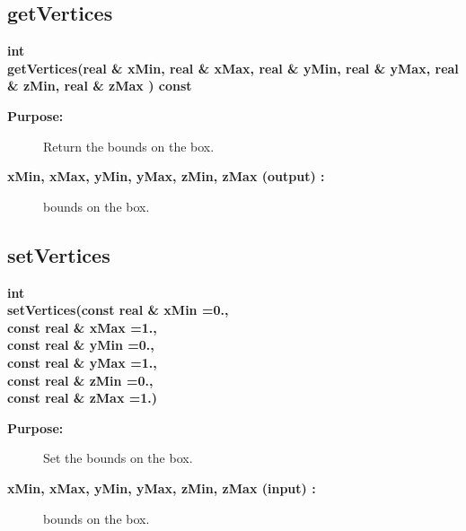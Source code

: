 \subsection{getVertices}
 
\begin{flushleft} \textbf{%
int   \\ 
\settowidth{\BoxMappingIncludeArgIndent}{getVertices(}%
getVertices(real \& xMin, real \& xMax, real \& yMin, real \& yMax, real \& zMin, real \& zMax ) const
}\end{flushleft}
\begin{description}
\item[{\bf Purpose:}]  Return the bounds on the box.
\item[{\bf xMin, xMax, yMin, yMax, zMin, zMax (output) :}]  bounds on the box.
\end{description}
\subsection{setVertices}
 
\begin{flushleft} \textbf{%
int  \\ 
\settowidth{\BoxMappingIncludeArgIndent}{setVertices(}%
setVertices(const real \& xMin  =0.,\\ 
\hspace{\BoxMappingIncludeArgIndent}const real \& xMax  =1., \\ 
\hspace{\BoxMappingIncludeArgIndent}const real \& yMin  =0., \\ 
\hspace{\BoxMappingIncludeArgIndent}const real \& yMax  =1.,\\ 
\hspace{\BoxMappingIncludeArgIndent}const real \& zMin  =0.,\\ 
\hspace{\BoxMappingIncludeArgIndent}const real \& zMax  =1.)
}\end{flushleft}
\begin{description}
\item[{\bf Purpose:}]  Set the bounds on the box.
\item[{\bf xMin, xMax, yMin, yMax, zMin, zMax (input) :}]  bounds on the box.
\end{description}
